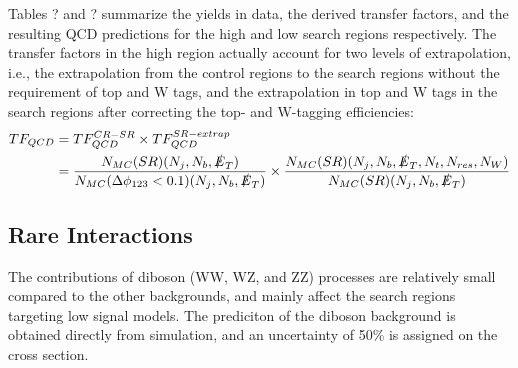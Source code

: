 Tables ? and ? summarize the yields in data, the derived transfer factors, and the resulting QCD predictions for the high \dm{} and low \dm{} search regions respectively. The transfer factors in the high \dm{} region actually account for two levels of extrapolation, i.e., the extrapolation from the control regions to the search regions without the requirement of top and W tags, and the extrapolation in top and W tags in the search regions after correcting the top- and W-tagging efficiencies:
\begin{equation}\label{QCDTFExtrapolation}
\begin{split}
TF_{QCD}&=TF_{QCD}^{CR-SR}\times TF_{QCD}^{SR-extrap} \\
&=\frac{N_{MC}(SR)(N_{j},N_{b},\slashed{E}_{T})}{N_{MC}(\Delta\phi_{123}<0.1)(N_{j},N_{b},\slashed{E}_{T})}\times\frac{N_{MC}(SR)(N_{j},N_{b},\slashed{E}_{T},N_{t},N_{res},N_{W})}{N_{MC}(SR)(N_{j},N_{b},\slashed{E}_{T})}
\end{split}
\end{equation}

\subsection{Rare Interactions}
\label{subsec:rare}

The contributions of diboson (WW, WZ, and ZZ) processes are relatively small compared to the other backgrounds, and mainly affect the search regions targeting low \dm{} signal models. The prediciton of the diboson background is obtained directly from simulation, and an uncertainty of 50\% is assigned on the cross section.

